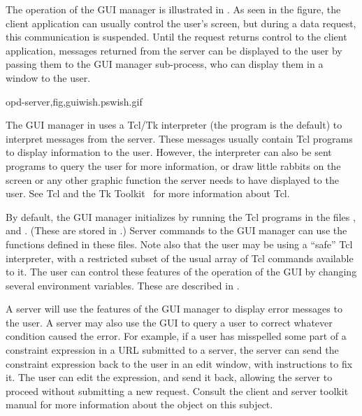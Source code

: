 The operation of the GUI manager is illustrated in
.  As seen in the figure, the client
application can usually control the user's screen, but during a data
request, this communication is suspended. Until the request returns
control to the client application, messages returned from the \opendap
server can be displayed to the user by passing them to the GUI manager
sub-process, who can display them in a window to the user.

{opd-server,fig,gui}{wish.ps}{wish.gif}{}

The GUI manager in \OPDversion uses a Tcl/Tk interpreter (the
 program is the default) to interpret messages from the
server. These messages usually contain Tcl programs to display
information to the user. However, the  interpreter can also
be sent programs to query the user for more information, or draw
little rabbits on the screen or any other graphic function the server
needs to have displayed to the user. See Tcl and the Tk
Toolkit~ for more information about Tcl.

By default, the GUI manager initializes by running the Tcl programs in
the files ,  and .
(These are stored in .) Server commands to the
GUI manager can use the functions defined in these files. Note also
that the user may be using a ``safe'' Tcl interpreter, with a
restricted subset of the usual array of Tcl commands available to it.
The user can control these features of the operation of the GUI by
changing several environment variables.  These are described in
. 

 

A server will use the features of the GUI manager to display error
messages to the user. A server may also use the GUI to query a user to
correct whatever condition caused the error. For example, if a user has
misspelled some part of a constraint expression in a URL submitted to a
server, the server can send the constraint expression back to the user in
an edit window, with instructions to fix it. The user can edit the
expression, and send it back, allowing the server to proceed without
submitting a new request. Consult the client and server toolkit manual
for more information about the  object on this subject.

